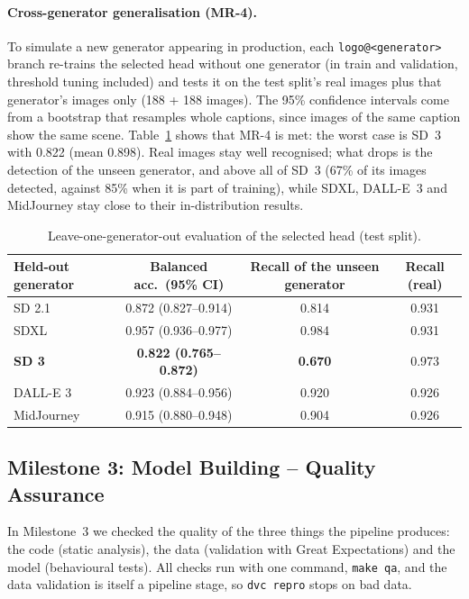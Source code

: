 \documentclass[11pt]{article}
\begin{document}
\paragraph{Cross-generator generalisation (MR-4).} To simulate a new generator appearing in production, each \texttt{logo@<generator>} branch re-trains the selected head without one generator (in train and validation, threshold tuning included) and tests it on the test split's real images plus that generator's images only (188 + 188 images). The 95\% confidence intervals come from a bootstrap that resamples whole captions, since images of the same caption show the same scene. Table~\ref{tab:logo} shows that MR-4 is met: the worst case is SD~3 with 0.822 (mean 0.898). Real images stay well recognised; what drops is the detection of the unseen generator, and above all of SD~3 (67\% of its images detected, against 85\% when it is part of training), while SDXL, DALL-E~3 and MidJourney stay close to their in-distribution results.

\begin{table}[H]
\centering
\small
\begin{tabular}{@{}lccc@{}}
\toprule
\textbf{Held-out generator} & \textbf{Balanced acc.\ (95\% CI)} & \textbf{Recall of the unseen generator} & \textbf{Recall (real)} \\
\midrule
SD 2.1 & 0.872 (0.827--0.914) & 0.814 & 0.931 \\
SDXL & 0.957 (0.936--0.977) & 0.984 & 0.931 \\
\textbf{SD 3} & \textbf{0.822 (0.765--0.872)} & \textbf{0.670} & 0.973 \\
DALL-E 3 & 0.923 (0.884--0.956) & 0.920 & 0.926 \\
MidJourney & 0.915 (0.880--0.948) & 0.904 & 0.926 \\
\bottomrule
\end{tabular}
\caption{Leave-one-generator-out evaluation of the selected head (test split).}
\label{tab:logo}
\end{table}

\subsection{Milestone 3: Model Building -- Quality Assurance}
In Milestone~3 we checked the quality of the three things the pipeline produces: the code (static analysis), the data (validation with Great Expectations) and the model (behavioural tests). All checks run with one command, \texttt{make qa}, and the data validation is itself a pipeline stage, so \texttt{dvc repro} stops on bad data.
\end{document}

